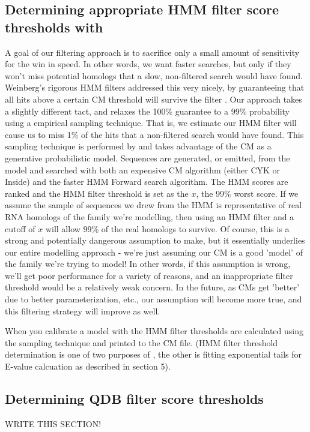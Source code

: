 \subsection{Determining appropriate HMM filter score thresholds with }

A goal of our filtering approach is to sacrifice only a small amount
of sensitivity for the win in speed. In other words, we want faster
searches, but only if they won't miss potential homologs that a slow,
non-filtered search would have found.  Weinberg's rigorous HMM filters
addressed this very nicely, by guaranteeing that all hits above a
certain CM threshold will survive the filter
\cite{WeinbergRuzzo04}. Our approach takes a slightly different tact,
and relaxes the 100\% guarantee to a 99\% probability using a
empirical sampling technique. That is, we estimate our HMM filter will
cause us to miss 1\% of the hits that a non-filtered search would have
found. This sampling technique is performed by  and
takes advantage of the CM as a generative probabilistic model.
Sequences are generated, or emitted, from the model and searched with
both an expensive CM algorithm (either CYK or Inside) and the faster
HMM Forward search algorithm. The HMM scores are ranked and the HMM
filter threshold is set as the $x$, the 99\% worst score. If we assume
the sample of sequences we drew from the HMM is representative of real
RNA homologs of the family we're modelling, then using an HMM filter
and a cutoff of $x$ will allow 99\% of the real homologs to
survive. Of course, this is a strong and potentially dangerous
assumption to make, but it essentially underlies our entire modelling
approach - we're just assuming our CM is a good 'model' of the family
we're trying to model!  In other words, if this assumption is wrong,
we'll get poor performance for a variety of reasons, and an
inappropriate filter threshold would be a relatively weak concern.  In
the future, as CMs get 'better' due to better parameterization, etc.,
our assumption will become more true, and this filtering strategy will
improve as well. 

When you calibrate a model with  the HMM filter
thresholds are calculated using the sampling technique and printed to
the CM file. (HMM filter threshold determination is one of two
purposes of , the other is fitting exponential tails
for E-value calcuation as described in section 5).

\subsection{Determining QDB filter score thresholds} 
WRITE THIS SECTION!


